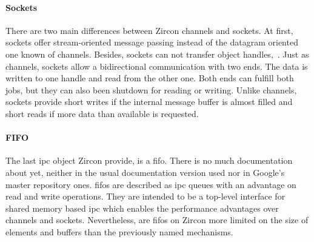 %
%
%
%
%

\paragraph{Sockets}
There are two main differences between Zircon channels and sockets.
At first, sockets offer stream-oriented message passing instead of the datagram oriented one known of channels.
Besides, sockets can not transfer object handles\cite{zircon-concepts},~\cite{zircon-socket}.
Just as channels, sockets allow a bidirectional communication with two ends.
The data is written to one handle and read from the other one. 
Both ends can fulfill both jobs, but they can also been shutdown for reading or writing\cite{zircon-socket}.
Unlike channels, sockets provide short writes if the internal message buffer is almost filled and short reads if more data than available is requested\cite{zircon-concepts}.

%
%
%

\paragraph{FIFO}
The last \ac{ipc} object Zircon provide, is a \ac{fifo}.
There is no much documentation about yet, neither in the usual documentation version used nor in Google's master repository ones.
\acp{fifo} are described as \ac{ipc} queues with an advantage on read and write operations.
They are intended to be a top-level interface for shared memory based \ac{ipc} which enables the performance advantages over channels and sockets.
Nevertheless, are \acp{fifo} on Zircon more limited on the size of elements and buffers than the previously named mechanisms\cite{zircon-fifo}.

